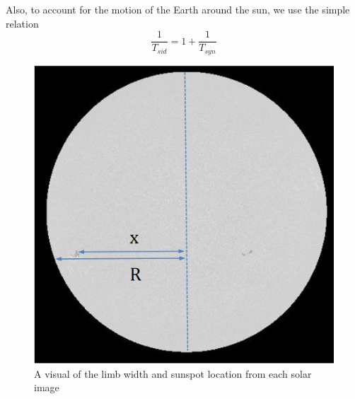 \documentclass[%
aip,
jmp,
reprint,
floatfix,
]{revtex4-1}
\begin{document}
	Also, to account for the motion of the Earth around the sun, we use the simple relation
	\begin{equation}
	\frac{1}{T_{sid}} = 1 + \frac{1}{T_{syn}}
	\end{equation}
	
	\begin{figure}
		\includegraphics[width=.9\linewidth]{figs/pos.png}
		\caption{A visual of the limb width and sunspot location from each solar image}
		\label{fig:pos}
	\end{figure}

\end{document}
